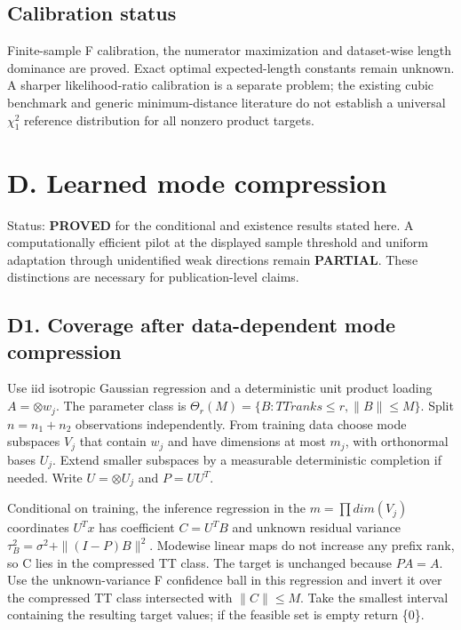 \documentclass[
  11pt,
]{article}
\begin{document}
\subsection{Calibration status}\label{calibration-status}

Finite-sample F calibration, the numerator maximization and dataset-wise
length dominance are proved. Exact optimal expected-length constants
remain unknown. A sharper likelihood-ratio calibration is a separate
problem; the existing cubic benchmark and generic minimum-distance
literature do not establish a universal \(\chi ^{2}_1\) reference
distribution for all nonzero product targets.

\newpage

\section{D. Learned mode compression}\label{d.-learned-mode-compression}

Status: \textbf{PROVED} for the conditional and existence results stated
here. A computationally efficient pilot at the displayed sample
threshold and uniform adaptation through unidentified weak directions
remain \textbf{PARTIAL}. These distinctions are necessary for
publication-level claims.

\subsection{D1. Coverage after data-dependent mode
compression}\label{d1.-coverage-after-data-dependent-mode-compression}

Use iid isotropic Gaussian regression and a deterministic unit product
loading \(A=\otimes w_j\). The parameter class is
\(\Theta _r(M)=\{B: TT ranks\le r, \|B\|\le M\}\). Split \(n=n_1+n_2\)
observations independently. From training data choose mode subspaces
\(V_j\) that contain \(w_j\) and have dimensions at most \(m_j\), with
orthonormal bases \(U_j\). Extend smaller subspaces by a measurable
deterministic completion if needed. Write \(U=\otimes U_j\) and
\(P=UU^T\).

Conditional on training, the inference regression in the
\(m=\prod dim(V_j)\) coordinates \(U^Tx\) has coefficient \(C=U^TB\) and
unknown residual variance \(\tau _B^{2}=\sigma ^{2}+\|(I-P)B\|^{2}\).
Modewise linear maps do not increase any prefix rank, so C lies in the
compressed TT class. The target is unchanged because \(PA=A\). Use the
unknown-variance F confidence ball in this regression and invert it over
the compressed TT class intersected with \(\|C\|\le M\). Take the
smallest interval containing the resulting target values; if the
feasible set is empty return \{0\}.
\end{document}
